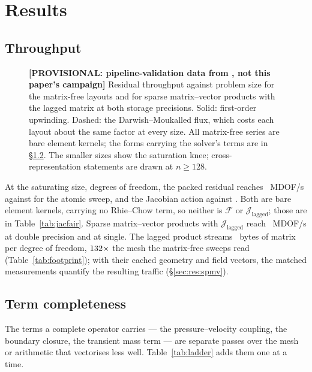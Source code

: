 \documentclass[sigconf,nonacm]{acmart}
\newcommand{\Fres}{\mathcal{F}}
\newcommand{\Jlag}{\mathcal{J}_{\mathrm{lagged}}}
\newcommand{\provwarn}{\ifnum\campProvisional=1 \textbf{[PROVISIONAL: pipeline-validation data from \campHost, not this paper's campaign]} \fi}
\begin{document}
\section{Results}
\label{sec:results}

\subsection{Throughput}
\label{sec:res:throughput}

\begin{figure}[t]
  \centering
  
  \caption{\provwarn Residual throughput against problem size for the matrix-free layouts and for
    sparse matrix--vector products with the lagged matrix at both storage precisions. Solid:
    first-order upwinding. Dashed: the Darwish--Moukalled flux, which costs each layout about
    the same factor at every size. All matrix-free series are bare element kernels; the forms
    carrying the solver's terms are in \S\ref{sec:res:ladder}. The smaller sizes show the
    saturation knee; cross-representation statements are drawn at $n\ge128$.}
  \label{fig:throughput}
\end{figure}

At the saturating size, \campDofs{} degrees of freedom, the packed residual reaches
\campResPacked{}~MDOF/s against \campResAtomic{} for the atomic sweep, and the Jacobian action
\campJacPacked{} against \campJacAtomic{}. Both are bare element kernels, carrying no
Rhie--Chow term, so neither is $\Fres$ or $\Jlag$; those are in
Table~\ref{tab:jacfair}. Sparse matrix--vector products with $\Jlag$ reach
\campSpmvF{}~MDOF/s at double precision and \campSpmvS{} at single. The lagged product streams
\fpMatrixFSixFour{}~bytes of matrix per degree of freedom, $132\times$ the mesh
the matrix-free sweeps read (Table~\ref{tab:footprint}); with their cached geometry and field
vectors, the matched measurements quantify the resulting traffic (\S\ref{sec:res:spmv}).

\subsection{Term completeness}
\label{sec:res:ladder}

The terms a complete operator carries --- the pressure--velocity coupling, the boundary closure,
the transient mass term --- are separate passes over the mesh or arithmetic that vectorises less
well. Table~\ref{tab:ladder} adds them one at a time.
\end{document}
